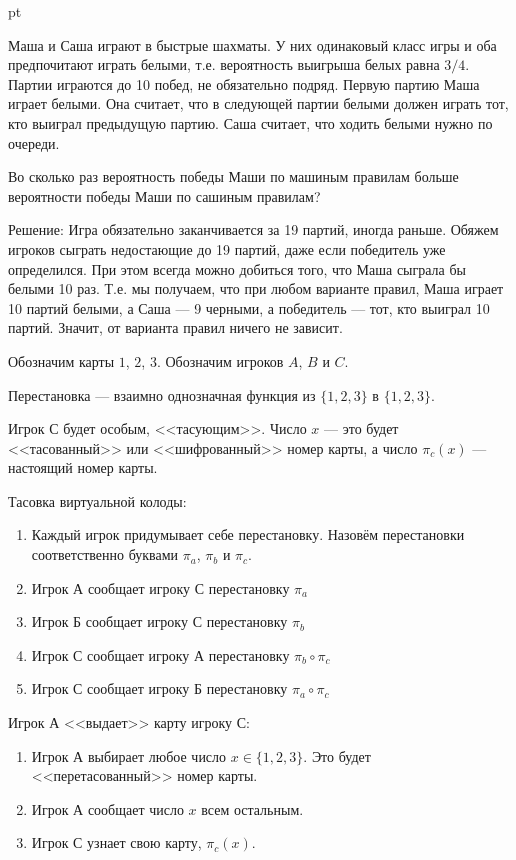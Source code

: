 \documentclass[pdftex,12pt,a4paper]{article}
\begin{document}
 pt %

Маша и Саша играют в быстрые шахматы. У них одинаковый класс игры и оба предпочитают
играть белыми, т.е. вероятность выигрыша белых равна $3/4$. Партии играются до 10 побед, не обязательно подряд. Первую партию Маша играет белыми. Она считает, что в следующей партии белыми должен играть тот, кто выиграл предыдущую партию. Саша считает, что ходить белыми нужно по очереди. 

Во сколько раз вероятность победы Маши по машиным правилам больше вероятности победы Маши по сашиным правилам?





Решение:
Игра обязательно заканчивается за 19 партий, иногда раньше. Обяжем игроков сыграть
недостающие до 19 партий, даже если победитель уже определился. При этом всегда
можно добиться того, что Маша сыграла бы белыми 10 раз. Т.е. мы получаем, что при
любом варианте правил, Маша играет 10 партий белыми, а Саша — 9 черными, а победитель --- тот, кто выиграл 10 партий. Значит, от варианта правил ничего не зависит.


\newpage
Обозначим карты $1$, $2$, $3$. Обозначим игроков $A$, $B$ и $C$.

Перестановка --- взаимно однозначная функция из $\{1,2,3\}$ в $\{1,2,3\}$.

Игрок С будет особым, <<тасующим>>. Число $x$ --- это будет <<тасованный>> или <<шифрованный>> номер карты, а число $\pi_c(x)$ --- настоящий номер карты.

Тасовка виртуальной колоды:
\begin{enumerate}
\item Каждый игрок придумывает себе перестановку. Назовём перестановки соответственно буквами $\pi_a$, $\pi_b$ и $\pi_c$.
\item Игрок А сообщает игроку С перестановку $\pi_a$
\item Игрок Б сообщает игроку С перестановку $\pi_b$
\item Игрок С сообщает игроку А перестановку $\pi_b\circ \pi_c$
\item Игрок С сообщает игроку Б перестановку $\pi_a\circ \pi_c$
\end{enumerate}

Игрок А <<выдает>> карту игроку С:
\begin{enumerate}[resume]
\item Игрок А выбирает любое число $x\in\{1,2,3\}$. Это будет <<перетасованный>> номер карты.
\item Игрок А сообщает число $x$ всем остальным.
\item Игрок С узнает свою карту, $\pi_c(x)$.
\end{enumerate}
\end{document}
